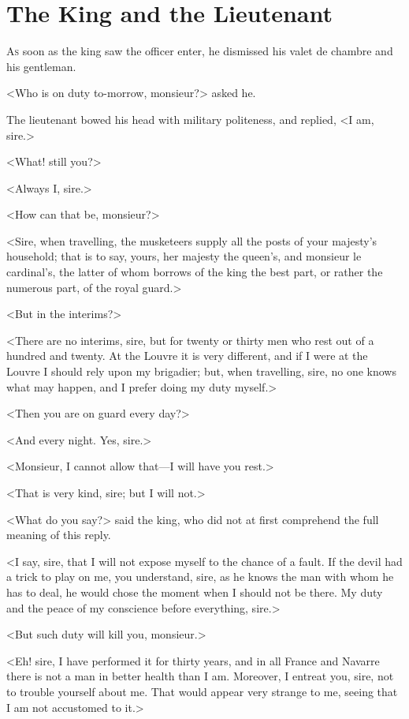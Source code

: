 \chapter{The King and the Lieutenant}

\lettrine{A}{s} soon as the king saw the officer enter, he dismissed his valet de chambre and his gentleman.

\zz
<Who is on duty to-morrow, monsieur?> asked he.

\zz
The lieutenant bowed his head with military politeness, and replied, <I am, sire.>

<What! still you?>

<Always I, sire.>

<How can that be, monsieur?>

<Sire, when travelling, the musketeers supply all the posts of your majesty's household; that is to say, yours, her majesty the queen's, and monsieur le cardinal's, the latter of whom borrows of the king the best part, or rather the numerous part, of the royal guard.>

<But in the interims?>

<There are no interims, sire, but for twenty or thirty men who rest out of a hundred and twenty. At the Louvre it is very different, and if I were at the Louvre I should rely upon my brigadier; but, when travelling, sire, no one knows what may happen, and I prefer doing my duty myself.>

<Then you are on guard every day?>

<And every night. Yes, sire.>

<Monsieur, I cannot allow that—I will have you rest.>

<That is very kind, sire; but I will not.>

<What do you say?> said the king, who did not at first comprehend the full meaning of this reply.

<I say, sire, that I will not expose myself to the chance of a fault. If the devil had a trick to play on me, you understand, sire, as he knows the man with whom he has to deal, he would chose the moment when I should not be there. My duty and the peace of my conscience before everything, sire.>

<But such duty will kill you, monsieur.>

<Eh! sire, I have performed it for thirty years, and in all France and Navarre there is not a man in better health than I am. Moreover, I entreat you, sire, not to trouble yourself about me. That would appear very strange to me, seeing that I am not accustomed to it.>

